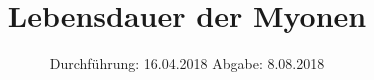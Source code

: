 
\subject{V01}
\title{\texorpdfstring{Lebensdauer der Myonen}{}}
\date{
	Durchführung: 16.04.2018
	\hspace{4em}
	Abgabe: 8.08.2018
}


	\maketitle
	\newpage
	\tableofcontents
	\newpage
	
	
	
	
	
	
	\newpage

	\printbibliography

